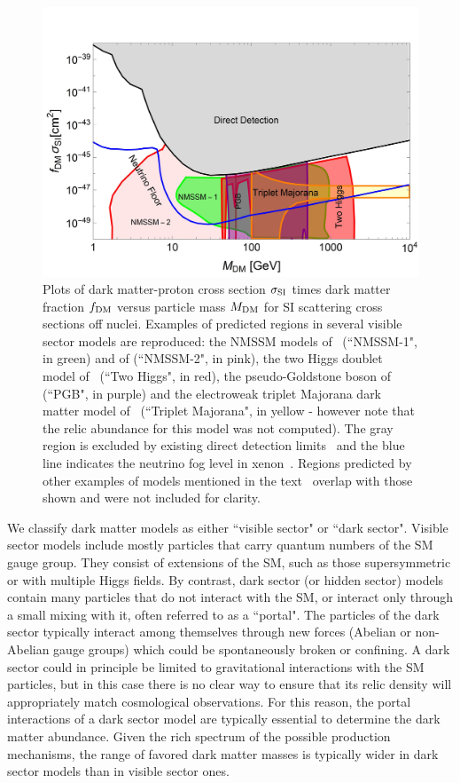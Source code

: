 \begin{figure}[t]
\begin{center}
\includegraphics[width=0.65\columnwidth]{figures/sigmap_visible_plot.jpg}
\caption{Plots of dark matter-proton cross section $\sigma_{\rm SI}$  times dark matter fraction $f_{\rm DM}$ versus particle mass $M_{\rm DM}$ for SI scattering cross sections off nuclei. Examples of predicted regions in several visible sector models are reproduced: the NMSSM models of~\cite{Lopez-Fogliani:2021qpq} (``NMSSM-1", in green) and of \cite{Wang:2020xta} (``NMSSM-2", in pink), the two Higgs doublet model of~\cite{Cabrera:2019gaq} (``Two Higgs", in red), the pseudo-Goldstone boson  of~\cite{Alanne:2020jwx} (``PGB", in purple) and the electroweak triplet Majorana dark matter model of~\cite{Chen:2018uqz} (``Triplet Majorana", in yellow - however note that the relic abundance for this model was not computed). The gray region is excluded by existing direct detection limits~\cite{Evans:2017kti} and the blue line indicates the neutrino fog level in xenon~\cite{Billard:2013qya,Ruppin:2014bra}. Regions predicted by other examples of models mentioned in the text~\cite{VanBeekveld:2021tgn, Mukherjee:2022kff, Khater:2021wcx, Chen:2018uqz, Chen:2019gtm,Berlin:2015ymu} overlap with those shown and were not included for clarity.}
\label{fig:sample_SI-VisibleSector}
\end{center}
\end{figure}
 
 We classify dark matter models as either ``visible sector" or ``dark sector".
 Visible sector models include mostly particles that carry quantum numbers of the SM gauge group. They consist of extensions of the SM,  such as those supersymmetric or with multiple Higgs fields. By contrast, dark sector (or hidden sector) models contain many particles that do not interact with the SM, or interact only through a small mixing with it, often referred to as a ``portal".  The particles of the dark sector typically interact among themselves through new forces (Abelian or non-Abelian gauge groups) which could be spontaneously broken or confining.
 A dark sector could in principle be limited to gravitational interactions with the SM particles, but in this case there is no clear way to ensure that its relic density will appropriately match cosmological observations.  For this reason, the
 portal interactions of a dark sector model are typically essential to determine the dark matter abundance. Given the rich spectrum of the possible production mechanisms, the range of favored dark matter masses is typically wider in dark sector models than in visible sector ones. 
 
